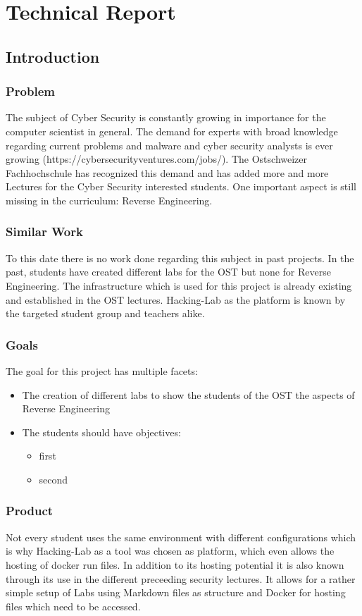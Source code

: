 \chapter{Technical Report}
\section{Introduction}
\subsection{Problem}
The subject of Cyber Security is constantly growing in importance for the computer scientist in general. The demand for experts with broad knowledge regarding current problems and malware and cyber security analysts is ever growing (https://cybersecurityventures.com/jobs/). The Ostschweizer Fachhochschule has recognized this demand and has added more and more Lectures for the Cyber Security interested students. One important aspect is still missing in the curriculum: Reverse Engineering.

\subsection{Similar Work}
To this date there is no work done regarding this subject in past projects. In the past, students have created different labs for the OST but none for Reverse Engineering. The infrastructure which is used for this project is already existing and established in the OST lectures. Hacking-Lab as the platform is known by the targeted student group and teachers alike. 

\subsection{Goals}
The goal for this project has multiple facets:
\begin{itemize}
    \item The creation of different labs to show the students of the OST the aspects of Reverse Engineering
    \item The students should have objectives:
    \begin{itemize}
        \item first
        \item second
    \end{itemize}
\end{itemize}
\subsection{Product}
Not every student uses the same environment with different configurations which is why Hacking-Lab as a tool was chosen as platform, which even allows the hosting of docker run files. In addition to its hosting potential it is also known through its use in the different preceeding security lectures. It allows for a rather simple setup of Labs using Markdown files as structure and Docker for hosting files which need to be accessed.
